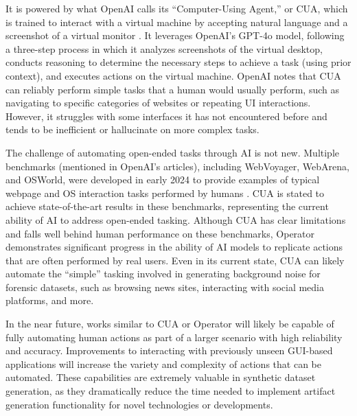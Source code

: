 \documentclass[letterpaper,12pt]{report}
\begin{document}
It is powered by what OpenAI calls its ``Computer-Using Agent,'' or CUA,
which is trained to interact with a virtual machine by accepting natural
language and a screenshot of a virtual monitor
\cite{openaiComputerUsingAgent2025}. It leverages OpenAI's GPT-4o
model, following a three-step process in which it analyzes screenshots
of the virtual desktop, conducts reasoning to determine the necessary
steps to achieve a task (using prior context), and executes actions on
the virtual machine. OpenAI notes that CUA can reliably perform simple
tasks that a human would usually perform, such as navigating to specific
categories of websites or repeating UI interactions. However, it
struggles with some interfaces it has not encountered before and tends
to be inefficient or hallucinate on more complex tasks.

The challenge of automating open-ended tasks through AI is not new.
Multiple benchmarks (mentioned in OpenAI's articles), including
WebVoyager, WebArena, and OSWorld, were developed in early 2024 to
provide examples of typical webpage and OS interaction tasks performed
by humans
\cite{zhouWebArenaRealisticWeb2024,heWebVoyagerBuildingEndtoEnd2024,xieOSWorldBenchmarkingMultimodal2024}.
CUA is stated to achieve state-of-the-art results in these benchmarks,
representing the current ability of AI to address open-ended tasking.
Although CUA has clear limitations and falls well behind human
performance on these benchmarks, Operator demonstrates significant
progress in the ability of AI models to replicate actions that are often
performed by real users. Even in its current state, CUA can likely
automate the ``simple'' tasking involved in generating background noise
for forensic datasets, such as browsing news sites, interacting with
social media platforms, and more.

In the near future, works similar to CUA or Operator will likely be
capable of fully automating human actions as part of a larger scenario
with high reliability and accuracy. Improvements to interacting with
previously unseen GUI-based applications will increase the variety and
complexity of actions that can be automated. These capabilities are
extremely valuable in synthetic dataset generation, as they dramatically
reduce the time needed to implement artifact generation functionality
for novel technologies or developments.
\end{document}
